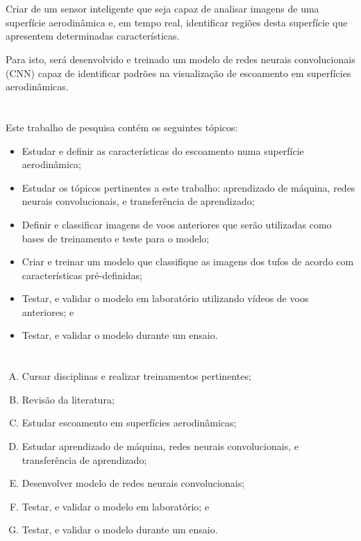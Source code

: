 \documentclass[12pt, a4paper]{article}
\begin{document}
\section{\sectionIII}
\label{sec:goal}
Criar de um sensor inteligente que seja capaz de analisar imagens de uma superfície aerodinâmica e, em tempo real, identificar regiões desta superfície que apresentem determinadas características.

Para isto, será desenvolvido e treinado um modelo de redes neurais convolucionais (CNN) capaz de identificar padrões na visualização de escoamento em superfícies aerodinâmicas.

\section{\sectionIV}
\label{sec:res-scope}
Este trabalho de pesquisa contém os seguintes tópicos:

\begin{itemize}
    \item Estudar e definir as características do escoamento numa superfície aerodinâmica;
    \item Estudar os tópicos pertinentes a este trabalho: aprendizado de máquina, redes neurais convolucionais, e  transferência de aprendizado;
    \item Definir e classificar imagens de voos anteriores que serão utilizadas como bases de treinamento e teste para o modelo;
    \item Criar e treinar um modelo que classifique as imagens dos tufos de acordo com características pré-definidas;
    \item Testar, e validar o modelo em laboratório utilizando vídeos de voos anteriores; e
    \item Testar, e validar o modelo durante um ensaio.
\end{itemize}

\section{\sectionV}
\label{sec:schedule}

\begin{enumerate}[A.]
    \item Cursar disciplinas e realizar treinamentos pertinentes;
    \item Revisão da literatura;
    \item Estudar escoamento em superfícies aerodinâmicas;
    \item Estudar aprendizado de máquina, redes neurais convolucionais, e  transferência de aprendizado;
    \item Desenvolver modelo de redes neurais convolucionais;
    \item Testar, e validar o modelo em laboratório; e
    \item Testar, e validar o modelo durante um ensaio.
\end{enumerate}
\end{document}
